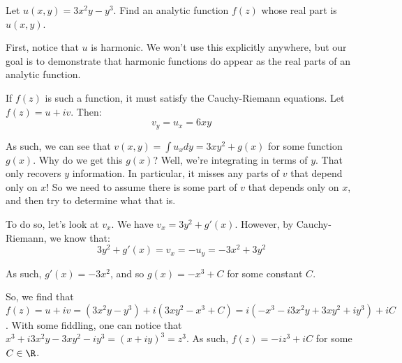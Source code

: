 \begin{ex}{}{} Let $u(x,y) = 3x^2y - y^3$. Find an analytic function $f(z)$ whose real part is $u(x,y)$.

First, notice that $u$ is harmonic. We won't use this explicitly anywhere, but our goal is to demonstrate that harmonic functions do appear as the real parts of an analytic function. 

If $f(z)$ is such a function, it must satisfy the Cauchy-Riemann equations. Let $f(z) = u + iv$. Then:
$$v_y = u_x = 6xy$$

As such, we can see that $v(x,y) = \int u_xdy = 3xy^2 + g(x)$ for some function $g(x)$. Why do we get this $g(x)$? Well, we're integrating in terms of $y$. That only recovers $y$ information. In particular, it misses any parts of $v$ that depend only on $x$! So we need to assume there is some part of $v$ that depends only on $x$, and then try to determine what that is.

To do so, let's look at $v_x$. We have $v_x = 3y^2 + g'(x)$. However, by Cauchy-Riemann, we know that:
$$3y^2 + g'(x) = v_x = -u_y = -3x^2 + 3y^2$$

As such, $g'(x) = -3x^2$, and so $g(x) = -x^3 + C$ for some constant $C$.

So, we find that $f(z) = u + iv = (3x^2y - y^3) + i(3xy^2 - x^3 + C) = i(-x^3 -i3x^2y + 3xy^2 +iy^3) + iC$. With some fiddling, one can notice that $x^3 + i3x^2y - 3xy^2 -iy^3 = (x+iy)^3 = z^3$. As such, $f(z) = -iz^3 + iC$ for some $C\in \R$.

\end{ex}